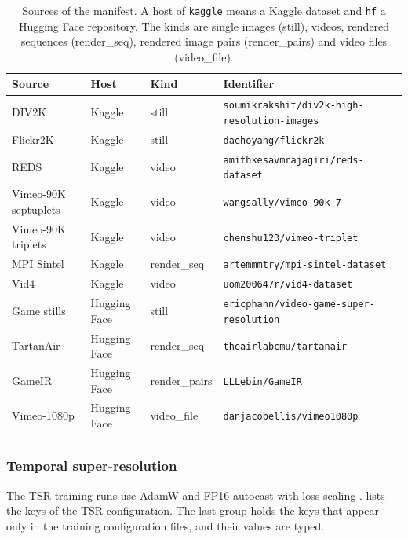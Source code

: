 \begin{table}[!htbp]
\caption{Sources of the manifest. A host of \texttt{kaggle} means a Kaggle dataset and \texttt{hf} a Hugging Face repository. The kinds are single images (still), videos, rendered sequences (render\_seq), rendered image pairs (render\_pairs) and video files (video\_file).}\label{tab:app-sources}
\footnotesize
\begin{tabular*}{\textwidth}{@{\extracolsep\fill}lllp{}}
\toprule
Source & Host & Kind & Identifier \\
\midrule
DIV2K & Kaggle & still & \texttt{soumikrakshit/\allowbreak div2k-high-resolution-images} \\
Flickr2K & Kaggle & still & \texttt{daehoyang/\allowbreak flickr2k} \\
REDS & Kaggle & video & \texttt{amithkesavmrajagiri/\allowbreak reds-dataset} \\
Vimeo-90K septuplets & Kaggle & video & \texttt{wangsally/\allowbreak vimeo-90k-7} \\
Vimeo-90K triplets & Kaggle & video & \texttt{chenshu123/\allowbreak vimeo-triplet} \\
MPI Sintel & Kaggle & render\_seq & \texttt{artemmmtry/\allowbreak mpi-sintel-dataset} \\
Vid4 & Kaggle & video & \texttt{uom200647r/\allowbreak vid4-dataset} \\
Game stills & Hugging Face & still & \texttt{ericphann/\allowbreak video-game-super-resolution} \\
TartanAir & Hugging Face & render\_seq & \texttt{theairlabcmu/\allowbreak tartanair} \\
GameIR & Hugging Face & render\_pairs & \texttt{LLLebin/\allowbreak GameIR} \\
Vimeo-1080p & Hugging Face & video\_file & \texttt{danjacobellis/\allowbreak vimeo1080p} \\
\botrule
\end{tabular*}
\end{table}

\subsubsection{Temporal super-resolution}\label{sec:app-cfg-tsr}

The TSR training runs use AdamW \cite{loshchilov2019adamw} and FP16 autocast with loss scaling \cite{micikevicius2018mixed}.  lists the keys of the TSR configuration. The last group holds the keys that appear only in the training configuration files, and their values are typed.

